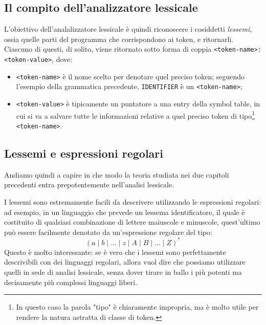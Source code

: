 \documentclass[class=book, crop=false, oneside, 12pt]{standalone}
\begin{document}
\subsection{Il compito dell'analizzatore lessicale}
L'obiettivo dell'analalizzatore lessicale è quindi riconoscere i cosiddetti \emph{lessemi}, ossia quelle parti del programma che corrispondono ai token, e ritornarli. Ciascuno di questi, di solito, viene ritornato sotto forma di coppia \texttt{<token-name>: <token-value>}, dove:
\begin{itemize}
    \item \texttt{<token-name>} è il nome scelto per denotare quel preciso token; seguendo l'esempio della grammatica precedente, \texttt{IDENTIFIER} è un \texttt{<token-name>};
    \item \texttt{<token-value>} è tipicamente un puntatore a una entry della symbol table, in cui si va a salvare tutte le informazioni relative a quel preciso token di tipo\footnote{In questo caso la parola "tipo" è chiaramente impropria, ma è molto utile per rendere la natura astratta di classe di token.} \texttt{<token-name>}.
\end{itemize}

\subsection{Lessemi e espressioni regolari}
Andiamo quindi a capire in che modo la teoria studiata nei due capitoli precedenti entra prepotentemente nell'analisi lessicale.

I lessemi sono estremamente facili da descrivere utilizzando le espressioni regolari: ad esempio, in un linguaggio che prevede un lessema identificatore, il quale è costituito di qualsiasi combinazione di lettere maiuscole e minuscole, quest'ultimo può essere facilmente denotato da un'espressione regolare del tipo:
\begin{equation*}
    (a \mid b \mid \ldots \mid z \mid A \mid B \mid \ldots \mid Z)^*
\end{equation*}
Questo è molto interessante: se è vero che i lessemi sono perfettamente descrivibili con dei linguaggi regolari, allora vuol dire che possiamo utilizzare quelli in sede di analisi lessicale, senza dover tirare in ballo i più potenti ma decisamente più complessi linguaggi liberi.
\end{document}
